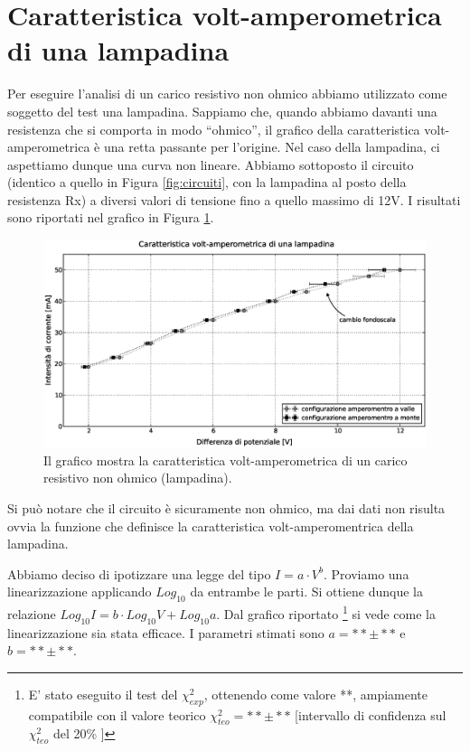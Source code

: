 \section{Caratteristica volt-amperometrica di una lampadina}
Per eseguire l'analisi di un carico resistivo non ohmico abbiamo utilizzato come soggetto del test una lampadina. Sappiamo che, quando abbiamo davanti una resistenza che si comporta in modo ``ohmico'', il grafico della caratteristica volt-amperometrica è una retta passante per l'origine. Nel caso della lampadina, ci aspettiamo dunque una curva non lineare. Abbiamo sottoposto il circuito (identico a quello in Figura \ref{fig:circuiti}, con la lampadina al posto della resistenza Rx) a diversi valori di tensione fino a quello massimo di 12V. I risultati sono riportati nel grafico in Figura \ref{fig:lampadina}.

\begin{figure}[h]
    \centering
        \includegraphics[width=\textwidth]{lamp.eps}
        \caption{Il grafico mostra la caratteristica volt-amperometrica di un carico resistivo non ohmico (lampadina).}
        \label{fig:lampadina}
\end{figure}

Si può notare che il circuito è sicuramente non ohmico, ma dai dati non risulta ovvia la funzione che definisce la caratteristica volt-amperomentrica della lampadina.

Abbiamo deciso di ipotizzare una legge del tipo $I=a \cdot V^{b}$. Proviamo una linearizzazione applicando $Log_{10}$ da entrambe le parti. Si ottiene dunque la relazione $Log_{10}I=b \cdot Log_{10}V + Log_{10}a$. Dal grafico riportato \footnote{E' stato eseguito il test del $\chi ^2_{exp}$, ottenendo come valore **, ampiamente compatibile con il valore teorico $\chi ^2_{teo}=** \pm **$ [intervallo di confidenza sul $\chi ^2_{teo}$ del 20\% ] } si vede come la linearizzazione sia stata efficace. I parametri stimati sono $a=** \pm **$ e $b=** \pm **$. 